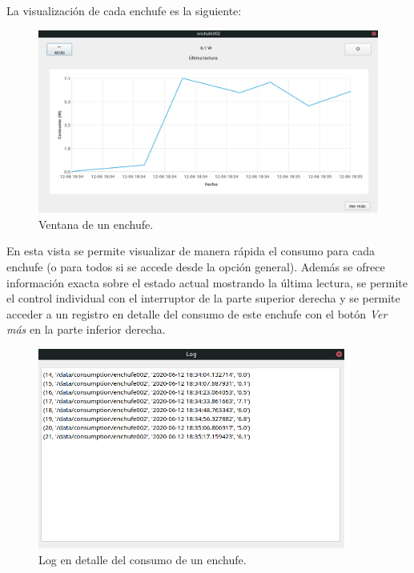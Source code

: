 \documentclass[a4paper,10pt]{article}
\begin{document}
La visualización de cada enchufe es la siguiente:

\begin{figure}[H]
  \centering
  \includegraphics[width=1\textwidth]{img/interfaz_graphics.png}
  \caption{Ventana de un enchufe.}\label{fig:interfaz-graphics}
\end{figure}

En esta vista se permite visualizar de manera rápida el consumo para
cada enchufe (o para todos si se accede desde la opción
general). Además se ofrece información exacta sobre el estado actual
mostrando la última lectura, se permite el control individual con el
interruptor de la parte superior derecha y se permite acceder a un
registro en detalle del consumo de este enchufe con el botón
\textit{Ver más} en la parte inferior derecha.

\begin{figure}[H]
  \centering
  \includegraphics[width=0.9\textwidth]{img/interfaz_log.png}
  \caption{Log en detalle del consumo de un enchufe.}\label{fig:interfaz-log}
\end{figure}
\end{document}

